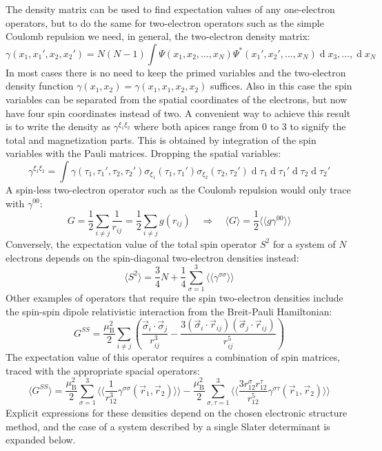 \documentclass[12pt]{article}
\newcommand{\dd}{\operatorname{d}}
\newcommand{\ev}[1]{\langle #1 \rangle}
\newcommand{\evv}[1]{\langle\langle #1 \rangle\rangle}
\begin{document}
The density matrix can be used to find expectation values of any one-electron operators, but to do the same for two-electron operators such as the simple Coulomb repulsion we need, in general, the two-electron density matrix:
\begin{equation}
 \gamma(x_1,x_1',x_2,x_2') = N(N-1)\int\Psi(x_1,x_2,\dots,x_N)\Psi^*(x_1',x_2',\dots,x_N)\dd x_3,\dots,\dd x_N
\end{equation}
In most cases there is no need to keep the primed variables and the two-electron density function $\gamma(x_1,x_2)=\gamma(x_1,x_1,x_2,x_2)$ suffices.
Also in this case the spin variables can be separated from the spatial coordinates of the electrons, but now have four spin coordinates instead of two.
A convenient way to achieve this result is to write the density as $\gamma^{\xi_1\xi_2}$ where both apices range from 0 to 3 to signify the total and magnetization parts.
This is obtained by integration of the spin variables with the Pauli matrices. Dropping the spatial variables:
\begin{equation}
\label{eq:gamma12}
 \gamma^{\xi_1\xi_2} = \int \gamma(\tau_1,\tau_1',\tau_2,\tau_2')\sigma_{\xi_1}(\tau_1,\tau_1')\sigma_{\xi_2}(\tau_2,\tau_2')\dd\tau_1\dd\tau_1'\dd\tau_2\dd\tau_2'
\end{equation}
A spin-less two-electron operator such as the Coulomb repulsion would only trace with $\gamma^{00}$:
\begin{equation}
 G = \frac{1}{2}\sum_{i\ne j}\frac{1}{r_{ij}} = \frac{1}{2}\sum_{i\ne j}g(r_{ij}) \quad\Longrightarrow\quad \ev{G} = \frac{1}{2}\evv{g\gamma^{00}}
\end{equation}
Conversely, the expectation value of the total spin operator $S^2$ for a system of $N$ electrons depends on the spin-diagonal two-electron densities instead:
\begin{equation}
\label{eq:S2}
 \ev{S^2} = \frac{3}{4}N + \frac{1}{4}\sum_{\sigma=1}^3\evv{\gamma^{\sigma\sigma}}
\end{equation}
Other examples of operators that require the spin two-electron densities include the spin-spin dipole relativistic interaction from the Breit-Pauli Hamiltonian:\cite{Dyall07_book327}
\begin{equation}
 G^{SS} = \frac{\mu_\mathrm{B}^2}{2} \sum_{i\ne j} \left(
  \frac{\vec{\sigma}_i\cdot\vec{\sigma}_j}{r_{ij}^3} -
  \frac{3(\vec{\sigma}_i\cdot\vec{r}_{ij})(\vec{\sigma}_j\cdot\vec{r}_{ij})}{r_{ij}^5} \right)
\end{equation}
The expectation value of this operator requires a combination of spin matrices, traced with the appropriate spacial operators:
\begin{equation}
 \ev{G^{SS}} = \frac{\mu_\mathrm{B}^2}{2}\sum_{\sigma=1}^3\evv{\frac{1}{r_{12}^3}\gamma^{\sigma\sigma}(\vec{r}_1,\vec{r}_2)} - 
               \frac{\mu_\mathrm{B}^2}{2}\sum_{\sigma,\tau=1}^3\evv{\frac{3r^\sigma_{12}r^\tau_{12}}{r_{12}^5}\gamma^{\sigma\tau}(\vec{r}_1,\vec{r}_2)} 
\end{equation}
Explicit expressions for these densities depend on the chosen electronic structure method, and the case of a system described by a single Slater determinant is expanded below.
\end{document}
